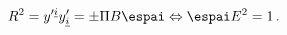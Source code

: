\begin{equation} \label{satura}
R^2=y'^{\underline{i}}y'_{\underline{i}}=\pm \Pi B \espai \Leftrightarrow
\espai E^2=1 \,.
\end{equation}


